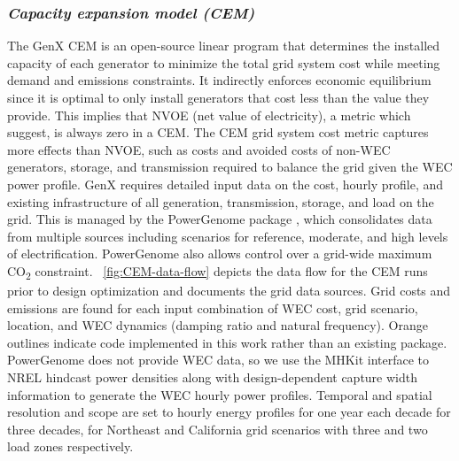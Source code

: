 \documentclass[10pt,twoside]{article}
\begin{document}
\subsubsection{\textit{Capacity expansion model (CEM)}}
The GenX CEM \cite{bonaldo_genxprojectgenxjl_2025} is an open-source linear program that determines the installed capacity of each generator to minimize the total grid system cost while meeting demand and emissions constraints.
It indirectly enforces economic equilibrium since it is optimal to only install generators that cost less than the value they provide.
This implies that NVOE (net value of electricity), a metric which \cite{mowers_evaluation_2021,mccabe_system_2023} suggest, is always zero in a CEM.
The CEM grid system cost metric captures more effects than NVOE, such as costs and avoided costs of non-WEC generators, storage, and transmission required to balance the grid given the WEC power profile.
GenX requires detailed input data on the cost, hourly profile, and existing infrastructure of all generation, transmission, storage, and load on the grid.
This is managed by the PowerGenome package \cite{schivley_powergenomepowergenome_2025}, which consolidates data from multiple sources including scenarios for reference, moderate, and high levels of electrification.
PowerGenome also allows control over a grid-wide maximum CO\textsubscript{2} constraint.
\figureautorefname~\ref{fig:CEM-data-flow} depicts the data flow for the CEM runs prior to design optimization and documents the grid data sources.
Grid costs and emissions are found for each input combination of WEC cost, grid scenario, location, and WEC dynamics (damping ratio and natural frequency).
Orange outlines indicate code implemented in this work rather than an existing package.
PowerGenome does not provide WEC data, so we use the MHKit interface \cite{klise_mhkit_2020} to NREL hindcast power densities \cite{wu_development_2020,allahdadi_development_2019} along with design-dependent capture width information to generate the WEC hourly power profiles. 
Temporal and spatial resolution and scope are set to hourly energy profiles for one year each decade for three decades, for Northeast and California grid scenarios with three and two load zones respectively.
\end{document}
